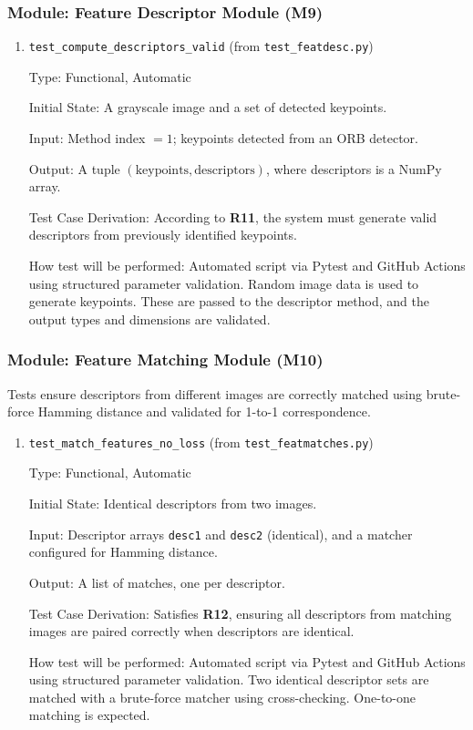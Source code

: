 \documentclass[12pt, titlepage]{article}
\begin{document}
\subsubsection{Module: Feature Descriptor Module (M9)}
\begin{enumerate}
  \item \texttt{test\_compute\_descriptors\_valid} \textnormal{(from \texttt{test\_featdesc.py})}
  
  Type: Functional, Automatic
  
  Initial State: A grayscale image and a set of detected keypoints.
  
  Input: Method index \(= 1\); keypoints detected from an ORB detector.
  
  Output: A tuple \((\text{keypoints}, \text{descriptors})\), where descriptors is a NumPy array.
  
  Test Case Derivation: According to \textbf{R11}, the system must generate valid descriptors from previously identified keypoints.
  
  How test will be performed: Automated script via Pytest and GitHub Actions using structured parameter validation. Random image data is used to generate keypoints. These are passed to the descriptor method, and the output types and dimensions are validated.
  \end{enumerate}
  



\subsubsection{Module: Feature Matching Module (M10)}

Tests ensure descriptors from different images are correctly matched using brute-force Hamming distance and validated for 1-to-1 correspondence.

\begin{enumerate}
  \item \texttt{test\_match\_features\_no\_loss} \textnormal{(from \texttt{test\_featmatches.py})}
  
  Type: Functional, Automatic
  
  Initial State: Identical descriptors from two images.
  
  Input: Descriptor arrays \texttt{desc1} and \texttt{desc2} (identical), and a matcher configured for Hamming distance.
  
  Output: A list of matches, one per descriptor.
  
  Test Case Derivation: Satisfies \textbf{R12}, ensuring all descriptors from matching images are paired correctly when descriptors are identical.
  
  How test will be performed: Automated script via Pytest and GitHub Actions using structured parameter validation. Two identical descriptor sets are matched with a brute-force matcher using cross-checking. One-to-one matching is expected.
  \end{enumerate}
    
\end{document}
